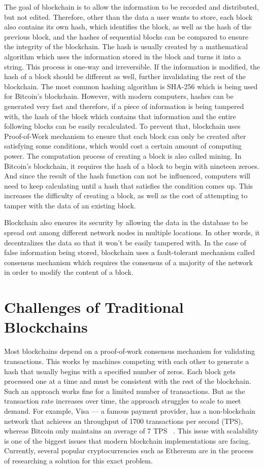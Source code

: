 The goal of blockchain is to allow the information to be recorded and distributed, but not edited. Therefore, other than the data a user wants to store, each block also contains its own hash, which identifies the block, as well as the hash of the previous block, and the hashes of sequential blocks can be compared to ensure the integrity of the blockchain. The hash is usually created by a mathematical algorithm which uses the information stored in the block and turns it into a string. This process is one-way and irreversible. If the information is modified, the hash of a block should be different as well, further invalidating the rest of the blockchain. The most common hashing algorithm is SHA-256 which is being used for Bitcoin’s blockchain. However, with modern computers, hashes can be generated very fast and therefore, if a piece of information is being tampered with, the hash of the block which contains that information and the entire following blocks can be easily recalculated. To prevent that, blockchain uses Proof-of-Work mechanism to ensure that each block can only be created after satisfying some conditions, which would cost a certain amount of computing power. The computation process of creating a block is also called mining. In Bitcoin’s blockchain, it requires the hash of a block to begin with nineteen zeroes. And since the result of the hash function can not be influenced, computers will need to keep calculating until a hash that satisfies the condition comes up. This increases the difficulty of creating a block, as well as the cost of attempting to tamper with the data of an existing block.

Blockchain also ensures its security by allowing the data in the database to be spread out among different network nodes in multiple locations. In other words, it decentralizes the data so that it won’t be easily tampered with. In the case of false information being stored, blockchain uses a fault-tolerant mechanism called consensus mechanism 
which requires the consensus of a majority of the network in order to modify the content of a block.

\section{Challenges of Traditional Blockchains}

Most blockchains depend on a proof-of-work consensus mechanism for validating transactions. This works by machines competing with each other to generate a hash that usually begins with a specified number of zeros. Each block gets processed one at a time and must be consistent with the rest of the blockchain. Such an approach works fine for a limited number of transactions. But as the transaction rate increases over time, the approach struggles to scale to meet demand. For example, Visa — a famous payment provider, has a non-blockchain network that achieves an throughput of 1700 transactions per second (TPS), whereas Bitcoin only maintains an average of 7 TPS ~\cite{craig_2021}. This issue with scalability is one of the biggest issues that modern blockchain implementations are facing. Currently, several popular cryptocurrencies such as Ethereum are in the process of researching a solution for this exact problem.


